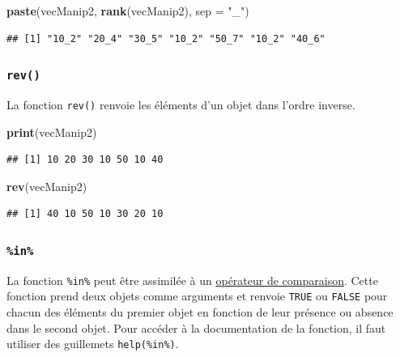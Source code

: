 \documentclass[
]{book}
\newenvironment{Shaded}{\begin{snugshade}}{\end{snugshade}}
\newcommand{\DataTypeTok}[1]{\textcolor[rgb]{0.13,0.29,0.53}{#1}}
\newcommand{\KeywordTok}[1]{\textcolor[rgb]{0.13,0.29,0.53}{\textbf{#1}}}
\newcommand{\NormalTok}[1]{#1}
\newcommand{\StringTok}[1]{\textcolor[rgb]{0.31,0.60,0.02}{#1}}
\begin{document}
\begin{Shaded}
\begin{Highlighting}[]
\KeywordTok{paste}\NormalTok{(vecManip2, }\KeywordTok{rank}\NormalTok{(vecManip2), }\DataTypeTok{sep =} \StringTok{"_"}\NormalTok{)}
\end{Highlighting}
\end{Shaded}

\begin{verbatim}
## [1] "10_2" "20_4" "30_5" "10_2" "50_7" "10_2" "40_6"
\end{verbatim}

\hypertarget{l015rev}{%
\subsubsection{\texorpdfstring{\texttt{rev()}}{rev()}}\label{l015rev}}

La fonction \texttt{rev()} renvoie les éléments d'un objet dans l'ordre inverse.

\begin{Shaded}
\begin{Highlighting}[]
\KeywordTok{print}\NormalTok{(vecManip2)}
\end{Highlighting}
\end{Shaded}

\begin{verbatim}
## [1] 10 20 30 10 50 10 40
\end{verbatim}

\begin{Shaded}
\begin{Highlighting}[]
\KeywordTok{rev}\NormalTok{(vecManip2)}
\end{Highlighting}
\end{Shaded}

\begin{verbatim}
## [1] 40 10 50 10 30 20 10
\end{verbatim}

\hypertarget{l015in}{%
\subsubsection{\texorpdfstring{\texttt{\%in\%}}{\%in\%}}\label{l015in}}

La fonction \texttt{\%in\%} peut être assimilée à un \protect\hyperlink{l011opcomp}{opérateur de comparaison}. Cette fonction prend deux objets comme arguments et renvoie \texttt{TRUE} ou \texttt{FALSE} pour chacun des éléments du premier objet en fonction de leur présence ou absence dans le second objet. Pour accéder à la documentation de la fonction, il faut utiliser des guillemets \texttt{help(\textquotesingle{}\%in\%\textquotesingle{})}.
\end{document}
